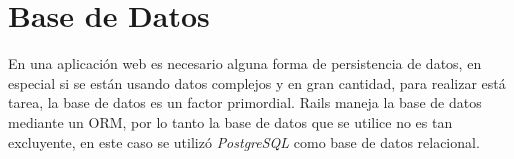 


  \section{Base de Datos} %
  \label{sec:base_de_datos}

    En una aplicación web es necesario alguna forma de persistencia de datos, en especial si se están usando datos complejos y en gran cantidad, para realizar está tarea, la base de datos es un factor primordial.
    Rails maneja la base de datos mediante  un ORM, por lo tanto la base de datos que se utilice no es tan excluyente, en este caso se utilizó  \emph{PostgreSQL} como base de datos relacional.\\

